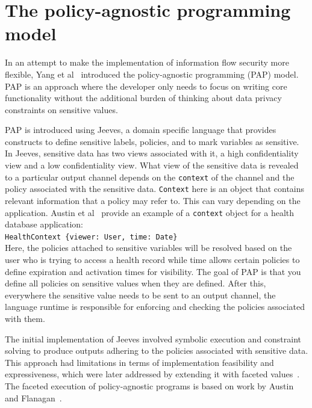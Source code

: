 \section{The policy-agnostic programming model \label{sec:PAPModel}}
In an attempt to make the implementation of information flow security more flexible,
Yang et al~\cite{Jeeves} introduced the policy-agnostic programming (PAP) model.
PAP is an approach where the developer only needs to focus on writing core functionality
without the additional burden of thinking about data privacy constraints on sensitive
values.

PAP is introduced using Jeeves, a domain specific language that provides constructs
to define sensitive labels, policies, and to mark variables as sensitive. In
Jeeves, sensitive data has two views associated with it, a high confidentiality
view and a low confidentiality view. What view of the sensitive data is revealed
to a particular output channel depends on the \texttt{context} of the channel and the
policy associated with the sensitive data. \texttt{Context} here is an object that
contains relevant information that a policy may refer to. This can vary depending
on the application. Austin et al~\cite{FacetedJeeves} provide an example of a
\texttt{context} object for a health database application:\\
\indent \indent \texttt{HealthContext \{viewer: User, time: Date\}}\\
Here, the policies attached to sensitive variables will be resolved based on the
user who is trying to access a health record while time allows certain policies
to define expiration and activation times for visibility.
The goal of PAP is that you define all policies on sensitive values when they
are defined. After this, everywhere the sensitive value needs to be sent to an
output channel, the language runtime is responsible for enforcing and checking
the policies associated with them.

The initial implementation of Jeeves involved symbolic execution and constraint
solving to produce outputs adhering to the policies associated with sensitive data.
This approach had limitations in terms of implementation feasibility and expressiveness,
which were later addressed by extending it with faceted values~\cite{FacetedJeeves}.
The faceted execution of policy-agnostic programs is based on work by Austin and
Flanagan~\cite{Faceted}.

